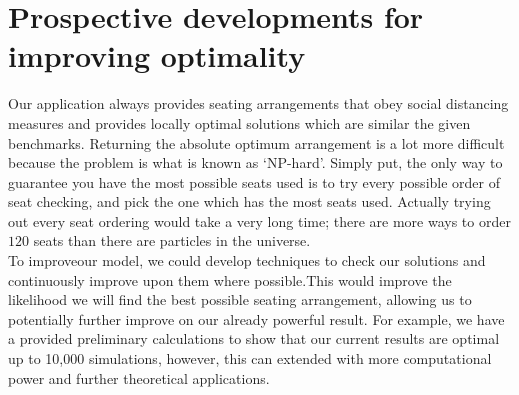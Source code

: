 \documentclass[11pt,a4paper]{article}
\begin{document}
\section*{Prospective developments for improving optimality}
Our application always provides seating arrangements that obey social distancing measures and provides locally optimal solutions which are similar the given benchmarks. Returning the  absolute optimum arrangement  is a lot more difficult because the problem is what is known as `NP-hard'.  Simply put, the only way to guarantee you have the most possible seats used is to try every possible order of seat checking, and pick the one which has the most seats used. Actually trying out every seat ordering would take a very long time; there are more ways to order $120$ seats than there are particles in the universe.\\

To improveour model, we could develop techniques to check our solutions and continuously improve upon them where possible.This would improve the likelihood we will find the best possible seating arrangement, allowing us to potentially further improve on our already powerful result. For example, we have a provided preliminary calculations to show that our current results are optimal up to 10,000 simulations, however, this can extended with more computational power and further theoretical applications.\\
\end{document}
